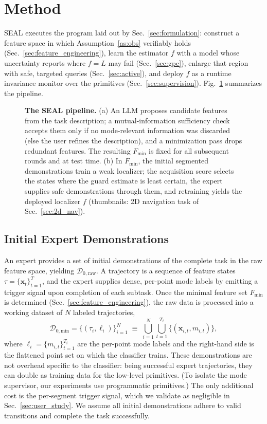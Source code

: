 \section{Method}
SEAL executes the program laid out by Sec.~\ref{sec:formulation}: construct a feature space in which Assumption~\ref{as:obs} verifiably holds (Sec.~\ref{sec:feature_engineering}), learn the estimator $f$ with a model whose uncertainty reports where $f=L$ may fail (Sec.~\ref{sec:gpc}), enlarge that region with safe, targeted queries (Sec.~\ref{sec:active}), and deploy $f$ as a runtime invariance monitor over the primitives (Sec.~\ref{sec:supervision}). Fig.~\ref{fig:framework} summarizes the pipeline.

\begin{figure}[t]
\centering

\caption{\textbf{The SEAL pipeline.} (a) An LLM proposes candidate features from the task description; a mutual-information sufficiency check accepts them only if no mode-relevant information was discarded (else the user refines the description), and a minimization pass drops redundant features. The resulting $F_{\min}$ is fixed for all subsequent rounds and at test time. (b) In $F_{\min}$, the initial segmented demonstrations train a weak localizer; the acquisition score selects the states where the guard estimate is least certain, the expert supplies safe demonstrations through them, and retraining yields the deployed localizer $f$ (thumbnails: 2D navigation task of Sec.~\ref{sec:2d_nav}).}
\label{fig:framework}
\end{figure}

\subsection{Initial Expert Demonstrations}
An expert provides a set of initial demonstrations of the complete task in the raw feature space, yielding $\mathcal{D}_{0,\text{raw}}$. A trajectory is a sequence of feature states $\tau=\{\mathbf{x}_t\}_{t=1}^{T}$, and the expert supplies dense, per-point mode labels by emitting a trigger signal upon completion of each subtask. Once the minimal feature set $F_{\min}$ is determined (Sec.~\ref{sec:feature_engineering}), the raw data is processed into a working dataset of $N$ labeled trajectories,
\begin{equation}
\mathcal{D}_{0,\text{min}}=\{(\tau_i,\ell_i)\}_{i=1}^N
\;\equiv\;\bigcup_{i=1}^{N}\bigcup_{t=1}^{T_i}\{(\mathbf{x}_{i,t},m_{i,t})\},
\end{equation}
where $\ell_i=\{m_{i,t}\}_{t=1}^{T_i}$ are the per-point mode labels and the right-hand side is the flattened point set on which the classifier trains. These demonstrations are not overhead specific to the classifier: being successful expert trajectories, they can double as training data for the low-level primitives. (To isolate the mode supervisor, our experiments use programmatic primitives.) The only additional cost is the per-segment trigger signal, which we validate as negligible in Sec.~\ref{sec:user_study}. We assume all initial demonstrations adhere to valid transitions and complete the task successfully.

